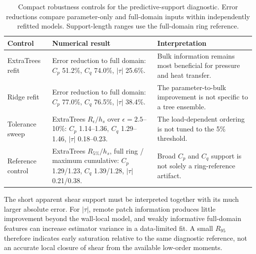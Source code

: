 \documentclass[aip,pof,preprint,notitlepage,floatfix,amsmath,amssymb]{revtex4-2}
\begin{document}
\begin{table}[t]
\centering
\caption{Compact robustness controls for the predictive-support diagnostic. Error reductions compare parameter-only and full-domain inputs within independently refitted models. Support-length ranges use the full-domain ring reference.}
\label{tab:robustness}
\small
\begin{tabular}{lll}
\toprule
\parbox[t]{0.20\textwidth}{Control} & \parbox[t]{0.35\textwidth}{Numerical result} & \parbox[t]{0.34\textwidth}{Interpretation} \\
\midrule
\parbox[t]{0.20\textwidth}{ExtraTrees refit} & \parbox[t]{0.35\textwidth}{Error reduction to full domain: $C_p$ 51.2\%, $C_q$ 74.0\%, $|\tau|$ 25.6\%.} & \parbox[t]{0.34\textwidth}{Bulk information remains most beneficial for pressure and heat transfer.} \\
\parbox[t]{0.20\textwidth}{Ridge refit} & \parbox[t]{0.35\textwidth}{Error reduction to full domain: $C_p$ 77.0\%, $C_q$ 76.5\%, $|\tau|$ 38.4\%.} & \parbox[t]{0.34\textwidth}{The parameter-to-bulk improvement is not specific to a tree ensemble.} \\
\parbox[t]{0.20\textwidth}{Tolerance sweep} & \parbox[t]{0.35\textwidth}{ExtraTrees $R_{\epsilon}/h_s$ over $\epsilon=2.5$--10\%: $C_p$ 1.14--1.36, $C_q$ 1.29--1.46, $|\tau|$ 0.18--0.23.} & \parbox[t]{0.34\textwidth}{The load-dependent ordering is not tuned to the 5\% threshold.} \\
\parbox[t]{0.20\textwidth}{Reference control} & \parbox[t]{0.35\textwidth}{ExtraTrees $R_{5\%}/h_s$, full ring / maximum cumulative: $C_p$ 1.29/1.23, $C_q$ 1.39/1.28, $|\tau|$ 0.21/0.38.} & \parbox[t]{0.34\textwidth}{Broad $C_p$ and $C_q$ support is not solely a ring-reference artifact.} \\
\bottomrule
\end{tabular}
\end{table}

The short apparent shear support must be interpreted together with its much larger absolute error. For $|\tau|$, remote patch information produces little improvement beyond the wall-local model, and weakly informative full-domain features can increase estimator variance in a data-limited fit. A small $R_{95}$ therefore indicates early saturation relative to the same diagnostic reference, not an accurate local closure of shear from the available low-order moments.
\end{document}
